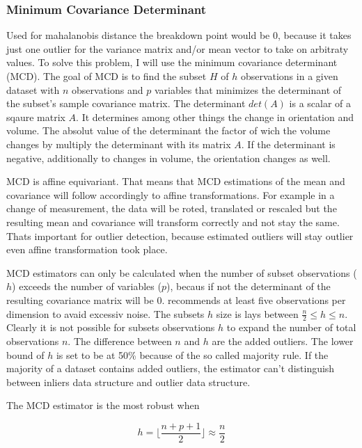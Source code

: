 \subsubsection*{Minimum Covariance Determinant}

Used for mahalanobis distance the breakdown point would be 0, because it takes just one outlier for the variance matrix and/or mean vector to take on arbitraty values. 
To solve this problem, I will use the minimum covariance determinant (MCD). 
The goal of MCD is to find the subset $H$ of $h$ observations in a given dataset with $n$ observations and $p$ variables that minimizes the determinant of the subset's sample covariance matrix.
The determinant $det(A)$ is a scalar of a sqaure matrix $A$.
It determines among other things  the change in orientation and volume.
The absolut value of the determinant the factor of wich the volume changes by multiply the determinant with its matrix $A$.
If the determinant is negative, additionally to changes in volume, the orientation changes as well.


MCD is affine equivariant. That means that MCD estimations of the mean and covariance will follow accordingly to 
affine transformations. For example in a change of measurement, the data will be roted, translated or rescaled but the resulting 
mean and covariance will transform correctly and not stay the same.
Thats important for outlier detection, because estimated outliers will stay outlier even affine transformation took place. \citet{hubert2018minimum}


MCD estimators can only be calculated when the number of subset observations ($h$) exceeds the number of variables ($p$), becaus if not the determinant 
of the resulting covariance matrix will be 0. \citet{hubert2018minimum} recommends at least five observations per dimension to avaid excessiv noise. 
The subsets $h$ size is lays between $\frac{n}{2} \le h \le n$. Clearly it is not possible for subsets observations $h$ to expand the number of total observations $n$. 
The difference between $n$ and $h$ are the added outliers.
The lower bound of $h$ is set to be at 50\% because of the so called majority rule.
If the majority of a dataset contains added outliers, the estimator can't distinguish between inliers data structure and outlier data structure. 

The MCD estimator is the most robust when 

\begin{equation}
    h = \lfloor \frac{n+p+1}{2} \rfloor \approx \frac{n}{2}
\end{equation}

